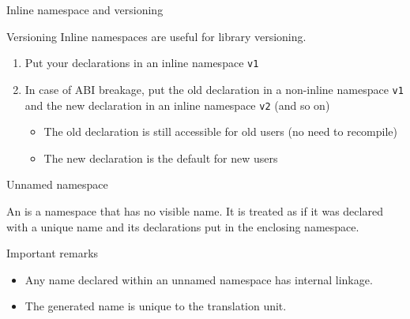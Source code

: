 \begin{frame}{Inline namespace and versioning}{}
  \begin{block}{Versioning}
    Inline namespaces are useful for library versioning.
    \begin{enumerate}
    \item
      Put your declarations in an inline namespace \lstinline!v1!
    \item
      In case of ABI breakage, put the old declaration in a non-inline namespace \lstinline!v1! and the new declaration in an inline namespace \lstinline!v2! (and so on)
      \begin{itemize}
      \item
        The old declaration is still accessible for old users (no need to recompile)
      \item
        The new declaration is the default for new users
      \end{itemize}
    \end{enumerate}
  \end{block}
  \begin{example}
  \end{example}
\end{frame}

\begin{frame}{Unnamed namespace}{}
  \begin{definition}
    An  is a namespace that has no visible name. It is treated as if it was declared with a unique name and its declarations put in the enclosing namespace.
  \end{definition}
  \begin{block}{Important remarks}
    \begin{itemize}
    \item
      Any name declared within an unnamed namespace has internal linkage. %
    \item
      The generated name is unique to the translation unit.
    \end{itemize}
  \end{block}
  \begin{example}
  \end{example}
\end{frame}

